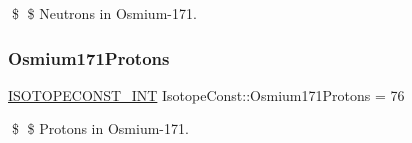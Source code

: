 \$ \$ Neutrons in Osmium-\/171. \mbox{\label{group___isotope_const-_osmium-_os171_gab33a423418a684f0a87ff03e793a64ce}} 
\subsubsection{\texorpdfstring{Osmium171\+Protons}{Osmium171Protons}}
{\footnotesize\ttfamily \mbox{\hyperlink{group___isotope_const-_macros_ga5f18360b3e99483a35c32d789e62621c}{I\+S\+O\+T\+O\+P\+E\+C\+O\+N\+S\+T\+\_\+\+I\+NT}} Isotope\+Const\+::\+Osmium171\+Protons = 76}

\$ \$ Protons in Osmium-\/171. 